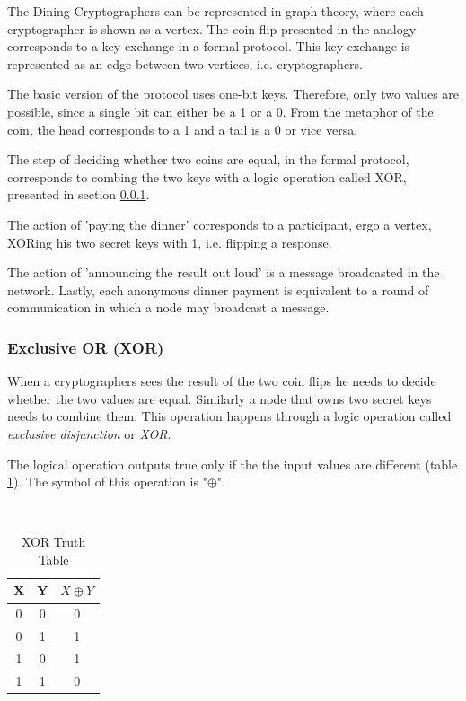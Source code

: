 The Dining Cryptographers can be represented in graph theory, where each cryptographer is shown as a vertex. The coin flip presented in the analogy corresponds to a key exchange in a formal protocol. This key exchange is represented as an edge between two vertices, i.e. cryptographers. 

The basic version of the protocol uses one-bit keys. Therefore, only two values are possible, since a single bit can either be a 1 or a 0. From the metaphor of the coin, the head corresponds to a 1 and a tail is a 0 or vice versa.

The step of deciding whether two coins are equal, in the formal protocol, corresponds to combing the two keys with a logic operation called XOR, presented in section \ref{sec:xor}.

The action of 'paying the dinner' corresponds to a participant, ergo a vertex, XORing his two secret keys with 1, i.e. flipping a response. 

The action of 'announcing the result out loud' is a message broadcasted in the network. Lastly, each anonymous dinner payment is equivalent to a round of communication in which a node may broadcast a message.

\subsubsection{Exclusive OR (XOR)} \label{sec:xor}
When a cryptographers sees the result of the two coin flips he needs to decide whether the two values are equal. Similarly a node that owns two secret keys needs to combine them. This operation happens through a logic operation called \textit{exclusive disjunction} or \textit{XOR}. 

The logical operation outputs true only if the the input values are different (table \ref{table:XOR}). The symbol of this operation is "$\oplus$".

\begin{table}[h!]
\centering
\caption{XOR Truth Table}
~\\[0.5ex]
\begin{tabular}{|| c | c | c ||} 
 \hline
 X & Y &  $X \oplus Y$ \\ [0.ex] 
 \hline\hline
 0 & 0 & 0 \\ 
 0 & 1 & 1 \\
 1 & 0 & 1 \\
 1 & 1 & 0 \\ [1ex]
 \hline
\end{tabular}
\label{table:XOR}
\end{table}

